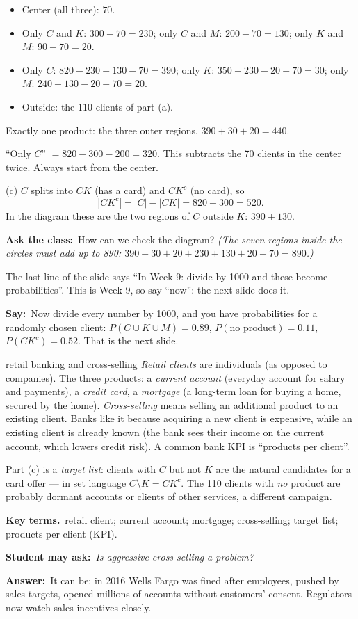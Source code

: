 \documentclass[11pt,a4paper,parskip=half]{scrartcl}
\newcommand{\terms}{\par\textbf{\color{plum}Key terms.}\ }
\newcommand{\sq}[1]{\par\textbf{\color{plum}Student may ask:}\ \emph{#1}\par}
\newcommand{\ans}{\textbf{Answer:}\ }
\newcommand{\say}{\textbf{\color{teal}Say:}\ }
\newcommand{\ask}{\textbf{\color{navy}Ask the class:}\ }
\begin{document}
\begin{itemize}
	\item Center (all three): $70$.
	\item Only $C$ and $K$: $300-70=230$; only $C$ and $M$: $200-70=130$;
	      only $K$ and $M$: $90-70=20$.
	\item Only $C$: $820-230-130-70=390$; only $K$: $350-230-20-70=30$;
	      only $M$: $240-130-20-70=20$.
	\item Outside: the $110$ clients of part (a).
\end{itemize}
Exactly one product: the three outer regions, $390+30+20=440$.

\begin{mistake}
	``Only $C$'' $=820-300-200=320$. This subtracts the 70 clients in the
	center twice. Always start from the center.
\end{mistake}

(c) $C$ splits into $CK$ (has a card) and $CK^c$ (no card), so
\[ |CK^c|=|C|-|CK|=820-300=520. \]
In the diagram these are the two regions of $C$ outside $K$: $390+130$.

\ask How can we check the diagram? \emph{(The seven regions inside the
circles must add up to 890: $390+30+20+230+130+20+70=890$.)}

\begin{cue}
	The last line of the slide says ``In Week 9: divide by 1000 and these
	become probabilities''. This is Week 9, so say ``now'': the next slide
	does it.
\end{cue}

\say Now divide every number by 1000, and you have probabilities for a
randomly chosen client: $P(C\cup K\cup M)=0.89$, $P(\text{no product})=0.11$,
$P(CK^c)=0.52$. That is the next slide.

\begin{bg}{retail banking and cross-selling}
	\emph{Retail clients} are individuals (as opposed to companies). The
	three products: a \emph{current account} (everyday account for salary and
	payments), a \emph{credit card}, a \emph{mortgage} (a long-term loan for
	buying a home, secured by the home). \emph{Cross-selling} means selling
	an additional product to an existing client. Banks like it because
	acquiring a new client is expensive, while an existing client is already
	known (the bank sees their income on the current account, which lowers
	credit risk). A common bank KPI is ``products per client''.

	Part (c) is a \emph{target list}: clients with $C$ but not $K$ are the
	natural candidates for a card offer --- in set language
	$C\setminus K=CK^c$. The 110 clients with \emph{no} product are probably
	dormant accounts or clients of other services, a different campaign.

	\terms retail client; current account; mortgage; cross-selling; target
	list; products per client (KPI).

	\sq{Is aggressive cross-selling a problem?}
	\ans It can be: in 2016 Wells Fargo was fined after employees, pushed by
	sales targets, opened millions of accounts without customers' consent.
	Regulators now watch sales incentives closely.
\end{bg}
\end{document}
